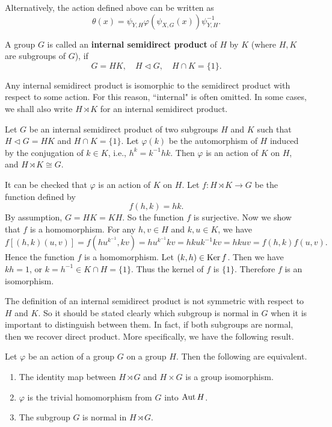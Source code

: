 \begin{remark}
	Alternatively, the action defined above can be written as
	\begin{equation*}
		\theta(x) = \psi_{Y,H}\varphi(\psi_{X,G}(x))\psi_{Y,H}^{-1}.
	\end{equation*}
\end{remark}
\begin{definition}
	A group $G$ is called an \textbf{internal semidirect product} of $H$ by $K$ (where $H,K$ are subgroups of $G$), if
	$$G = HK,\quad H \lhd G, \quad H \cap K = \{1\}.$$
\end{definition}
\begin{remark}
	Any internal semidirect product is 
	isomorphic to the semidirect product with respect to some action. For this
	reason, ``internal" is often omitted. In some cases, we shall also write $H\rtimes K$ for an internal semidirect product.
\end{remark}
\begin{proposition} \label{prop-internal-semidirect-prod-isom}
	Let $G$ be an internal semidirect product of two subgroups $H$ and $K$ such that $H \lhd G = HK$ and $H \cap K = \{1\}$. Let $\varphi(k)$ be the automorphism of $H$ induced by the conjugation of $k \in K$, i.e., $h^k = k^{-1}hk$. Then $\varphi$ is an action of $K$ on $H$, and $H \rtimes K  \cong G$.
\end{proposition}
\begin{sketch}
	It can be checked that $\varphi$ is an action of $K$ on $H$. Let $f:H \rtimes K \to G$ be the function defined by
	$$f(h, k) = hk.$$
	By assumption, $G = HK = KH$. So the function $f$ is surjective. Now we show that $f$ is a homomorphism. For any $h, v \in H$ and $k, u \in K$, we have
	$$f[(h,k)(u, v)] = f(hu^{k^{-1}},kv) = hu^{k^{-1}}kv = hkuk^{-1}kv = hkuv = f(h,k)f(u,v).$$Hence the function $f$ is a homomorphism. Let $(k, h) \in\operatorname{Ker} f$. Then we have $kh = 1$, or $k = h^{-1} \in K \cap H = \{1\}$. Thus the kernel of $f$ is $\{1\}$. Therefore $f$ is an isomorphism.
\end{sketch}
The definition of an internal semidirect product is not symmetric with respect to $H$ and $K$. So it should be stated clearly which subgroup is normal in $G$ when it is important to distinguish between them. In fact, if both subgroups are normal, then we recover  direct product. More specifically, we have the following result.
\begin{proposition} \label{prop-semidirect-trivial-hom}
	Let $\varphi$ be an action of a group $G$ on a group $H$. Then the following are equivalent.
	\begin{enumerate}[(1)]
		\item The identity  map between $H \rtimes G$ and $H \times G$ is a group isomorphism.
		\item $\varphi$ is the trivial homomorphism from $G$ into $\operatorname{Aut} H$.
		\item The subgroup $G$ is normal in $H \rtimes G$.
	\end{enumerate}
\end{proposition}
